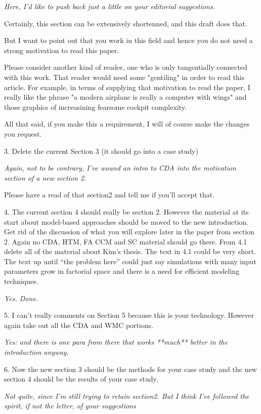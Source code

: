 \documentclass[journal]{IEEEtran}
\begin{document}
{\em Here, I'd like to push back just a little on your
editorial suggestions. 

Certainly, this section can
be extensively shortenned, and this draft does that. 

But I want
to point out that you work in this field and hence
you do not need a strong motivation to read this
paper.  

Please consider another kind of reader, one
who is only tangentially connected with this
work. That reader would need some "gentiling" in
order to read this article. For example, in terms of
supplying that motivation to read the paper, I
really like the phrase "a modern airplane is really
a computer with wings" and those graphics of
increasining fearsome cockpit complexity.

All that said, if you make this a requirement, I will of course make the changes you request.
}

3.      Delete the current Section 3 (it should go into a case study)

{\em Again, not to be contrary, I've wound an intro to CDA into the motivation section of a new section 2.

Please have a read of that section2 and tell me if you'll accept that.
}

4.  The current section 4 should really be section
2. However the material at its start about
model-based approaches should be moved to the new
introduction. Get rid of the discussion of what you
will explore later in the paper from section
2. Again no CDA, HTM, FA CCM and SC material should
go there. From 4.1 delete all of the material about
Kim’s thesis. The text in 4.1 could be very
short. The text up until “the problem here” could
just say simulations with many input parameters grow
in factorial space and there is a need for efficient
modeling techniques.

{\em Yes. Done.}

5.      I can’t really comments on Section 5 because this is your technology. However again take out all the CDA and WMC portions.

{\em Yes: and there is one para from there that works **much** better in the introduction anyway}.

6.      Now the new section 3 should be the methods for your case study and the new section 4 should be the results of your case study.

{\em Not quite, since I'm still trying to retain section2. But I think I've followed the spirit, if not the letter, of your suggestions}
\end{document}
